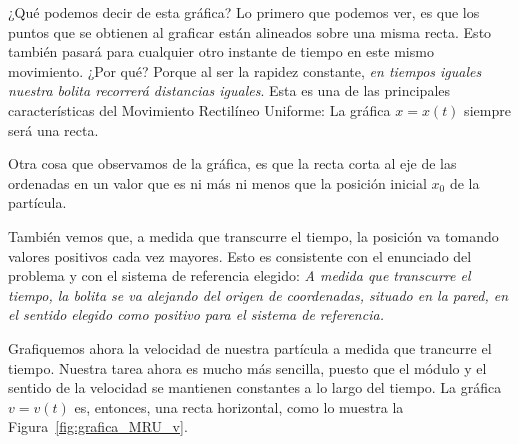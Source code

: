 ¿Qué podemos decir de esta gráfica? Lo primero que podemos ver, es que los puntos que se obtienen al graficar están alineados sobre una misma recta. Esto también pasará para cualquier otro instante de tiempo en este mismo movimiento. ¿Por qué? Porque al ser la rapidez constante, {\em en tiempos iguales nuestra bolita recorrerá distancias iguales}. Esta es una de las principales características del Movimiento Rectilíneo Uniforme: La gráfica $x=x(t)$ siempre será una recta.

Otra cosa que observamos de la gráfica, es que la recta corta al eje de las ordenadas en un valor que es ni más ni menos que la posición inicial $x_0$ de la partícula.

También vemos que, a medida que transcurre el tiempo, la posición va tomando valores positivos cada vez mayores. Esto es consistente con el enunciado del problema y con el sistema de referencia elegido: {\em A medida que transcurre el tiempo, la bolita se va alejando del origen de coordenadas, situado en la pared, en el sentido elegido como positivo para el sistema de referencia.}

Grafiquemos ahora la velocidad de nuestra partícula a medida que trancurre el tiempo. Nuestra tarea ahora es mucho más sencilla, puesto que el módulo y el sentido de la velocidad se mantienen constantes a lo largo del tiempo. La gráfica $v=v(t)$ es, entonces, una recta horizontal, como lo muestra la Figura~\ref{fig:grafica_MRU_v}.

